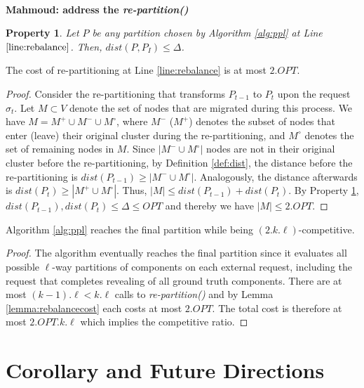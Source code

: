 \documentclass[manuscript,screen=true]{acmart}
\newtheorem{property}{Property}
\newcommand\mahmoud[1]{\color{green}\textbf{\\ Mahmoud: #1}\\\color{black}}
\begin{document}
\mahmoud{address the \textit{re-partition()}}

\begin{property} \label{prop:dist<OPT}
    Let $P$ be any partition chosen by Algorithm \ref{alg:ppl} at Line $\ref{line:rebalance}$.
    Then, $dist(P,P_I) \leq \Delta$.
\end{property}

\begin{lemma}	\label{lemma:rebalancecost}
    The cost of re-partitioning at Line \ref{line:rebalance} is at most $2.OPT$.
\end{lemma}
\begin{proof}
    Consider the re-partitioning that transforms $P_{t-1}$ to $P_t$ upon the request $\sigma_t$.
    Let $M \subset V$ denote the set of nodes that are migrated during this process.
    We have $M = M^+ \cup M^- \cup M^\circ$,
    where $M^-$ ($M^+$) denotes the subset of nodes that
    enter (leave) their original cluster during the re-partitioning,
    and $M^\circ$ denotes the set of remaining nodes in $M$.
    Since $|M^- \cup M^\circ|$ nodes are not in their original cluster before the re-partitioning,
    by Definition \ref{def:dist},
    the distance before the re-partitioning is $dist(P_{t-1}) \geq | M^- \cup M^\circ |$.
    Analogously,
     the distance afterwards is $dist(P_{t}) \geq | M^+ \cup M^\circ |$.
    Thus,
    $|M| \leq dist(P_{t-1}) + dist(P_{t})$.
    By Property \ref{prop:dist<OPT},
    $dist(P_{t-1}) , dist(P_{t}) \leq \Delta \leq OPT$
    and thereby we have	
    $|M| \leq 2.OPT$.
\end{proof}

\begin{theorem}	\label{thm:upperbound}
    Algorithm \ref{alg:ppl} reaches the final partition while being $(2.k.\ell)$-competitive.
\end{theorem}
\begin{proof}
    The algorithm eventually reaches the final partition since it
     evaluates all possible $\ell$-way partitions of components on each external request,
    including the request that completes revealing of all ground truth components.
    There are at most $(k-1).\ell < k.\ell $ calls to \emph{re-partition()} and by Lemma \ref{lemma:rebalancecost} each costs at most $2.OPT$.
    The total cost is therefore at most $2.OPT.k.\ell$ which implies the competitive ratio.
      \end{proof}

\section{Corollary and Future Directions}
\end{document}
